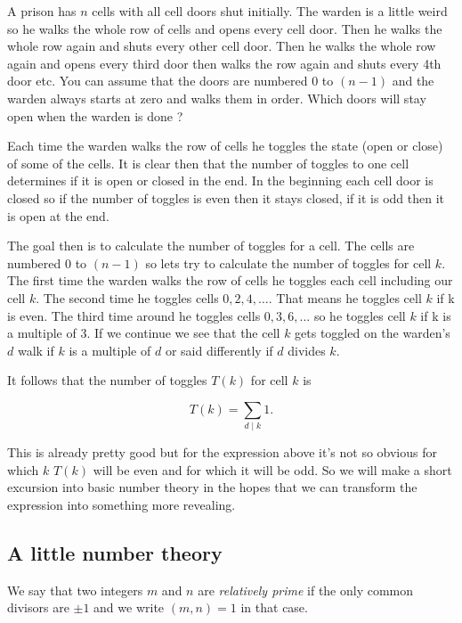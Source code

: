 \vspace{10 mm}
\begin{problem}
A prison has $n$ cells with all cell doors shut initially. The warden is a little weird so he walks the whole row of cells and opens every cell door. Then he walks the whole row again and shuts every other cell door. Then he walks the whole row again and opens every third door then walks the row again and shuts every 4th door etc. You can assume that the doors are numbered $0$ to $(n - 1)$ and the warden always starts at zero and walks them in order. Which doors will stay open when the warden is done ? 
\end{problem}

Each time the warden walks the row of cells he toggles the state (open or close) of some of the cells. It is clear then that the number of toggles to one cell determines if it is open or closed in the end. In the beginning each cell door is closed so if the number of toggles is even then it stays closed, if it is odd then it is open at the end.

The goal then is to calculate the number of toggles for a cell. The cells are numbered $0$ to $(n - 1)$ so lets try to calculate the number of toggles for cell $k$. The first time the warden walks the row of cells he toggles each cell including our cell $k$. The second time he toggles cells $0, 2, 4, \dots$. That means he toggles cell $k$ if k is even. The third time around he toggles cells $0, 3, 6, \dots$ so he toggles cell $k$ if k is a multiple of 3. If we continue we see that the cell $k$ gets toggled on the warden's $d$ walk if $k$ is a multiple of $d$ or said differently if $d$ divides $k$.

It follows that the number of toggles $T(k)$ for cell $k$ is

\[	 
	T(k) = \sum_{d \mid k} 1.
\]

This is already pretty good but for the expression above it's not so obvious for which $k$ $T(k)$ will be even and for which it will be odd. So we will make a short excursion into basic number theory in the hopes that we can transform the expression into something more revealing.

 \subsection{A little number theory}

We say that two integers $m$ and $n$ are \textit{relatively prime} if the only common divisors are $\pm 1$ and we write $(m, n) = 1$ in that case.

